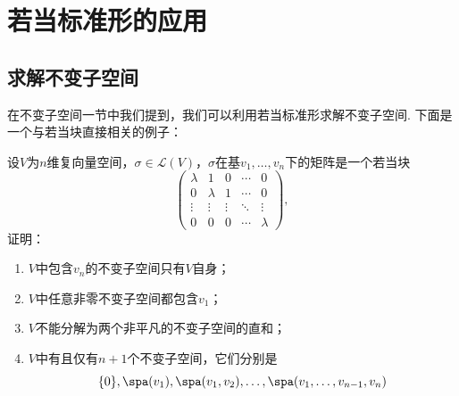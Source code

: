 \section{若当标准形的应用}
\subsection{求解不变子空间}
在不变子空间一节中我们提到，我们可以利用若当标准形求解不变子空间. 下面是一个与若当块直接相关的例子：
\begin{example}{}{}
    设$V$为$n$维复向量空间，$\sigma\in \mathcal{L}(V)$，$\sigma$在基$v_1,\ldots,v_n$下的矩阵是一个若当块
    \[\begin{pmatrix}
            \lambda & 1       & 0      & \cdots & 0       \\
            0       & \lambda & 1      & \cdots & 0       \\
            \vdots  & \vdots  & \vdots & \ddots & \vdots  \\
            0       & 0       & 0      & \cdots & \lambda
        \end{pmatrix},\]
    证明：
    \begin{enumerate}
        \item $V$中包含$v_n$的不变子空间只有$V$自身；

        \item $V$中任意非零不变子空间都包含$v_1$；

        \item $V$不能分解为两个非平凡的不变子空间的直和；

        \item $V$中有且仅有$n+1$个不变子空间，它们分别是
              \[\{0\},\spa(v_1),\spa(v_1,v_2),\ldots,\spa(v_1,\ldots,v_{n-1},v_n)\]
    \end{enumerate}
\end{example}

